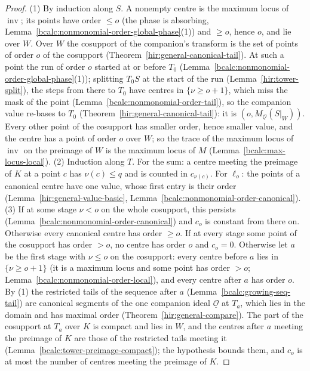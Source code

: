 \begin{proof}
\upstreamleanok
(1) By induction along \(S\). A nonempty centre is the maximum locus of \(\operatorname{inv}\); its points have order \(\le o\) (the phase is absorbing,
Lemma~\ref{bcalc:nonmonomial-order-global-phase}(1)) and \(\ge o\), hence \(o\), and lie over \(W\). Over \(W\) the cosupport of the companion's transform is the set of points of
order \(o\) of the cosupport (Theorem~\ref{hir:general-canonical-tail}). At such a point the run of order \(o\) started at or before \(T_0\)
(Lemma~\ref{bcalc:nonmonomial-order-global-phase}(1)); splitting \(T_0S\) at the start of the run (Lemma~\ref{hir:tower-split}), the steps from there to \(T_0\) have centres in
\(\{\nu\ge o+1\}\), which miss the mask of the point (Lemma~\ref{bcalc:nonmonomial-order-tail}), so the companion value re-bases to \(T_0\)
(Theorem~\ref{hir:general-canonical-tail}): it is \((o,M_{\underline{\mathcal O}}(S|_W))\). Every other point of the cosupport has smaller order, hence smaller value, and the centre
has a point of order \(o\) over \(W\); so the trace of the maximum locus of \(\operatorname{inv}\) on the preimage of \(W\) is the maximum locus of \(M\)
(Lemma~\ref{bcalc:max-locus-local}).
(2) Induction along \(T\). For the sum: a centre meeting the preimage of \(K\) at a point \(c\) has \(\nu(c)\le q\) and is counted in \(c_{\nu(c)}\). For \(\ell_o\): the points of a
canonical centre have one value, whose first entry is their order (Lemma~\ref{hir:general-value-basic}, Lemma~\ref{bcalc:nonmonomial-order-canonical}).
(3) If at some stage \(\nu<o\) on the whole cosupport, this persists (Lemma~\ref{bcalc:nonmonomial-order-canonical}) and \(c_o\) is constant from there on. Otherwise every
canonical centre has order \(\ge o\). If at every stage some point of the cosupport has order \(>o\), no centre has order \(o\) and \(c_o=0\). Otherwise let \(a\) be the first stage
with \(\nu\le o\) on the cosupport: every centre before \(a\) lies in \(\{\nu\ge o+1\}\) (it is a maximum locus and some point has order \(>o\);
Lemma~\ref{bcalc:nonmonomial-order-local}), and every centre after \(a\) has order \(o\). By (1) the restricted tails of the sequence after \(a\)
(Lemma~\ref{bcalc:growing-seq-tail}) are canonical segments of the one companion ideal \(\underline{\mathcal O}\) at \(T_a\), which lies in the domain and has maximal order
(Theorem~\ref{hir:general-compare}). The part of the cosupport at \(T_a\) over \(K\) is compact and lies in \(W\), and the centres after \(a\) meeting the preimage of \(K\) are
those of the restricted tails meeting it (Lemma~\ref{bcalc:tower-preimage-compact}); the hypothesis bounds them, and \(c_o\) is at most the number of centres meeting the
preimage of \(K\).
\end{proof}

